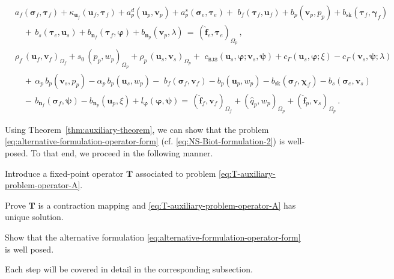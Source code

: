 \documentclass[11pt]{article}
\numberwithin{equation}{section}
\newcommand{\bgamma}{{\boldsymbol\gamma}}
\newcommand{\bsi}{{\boldsymbol\sigma}}
\newcommand{\bvarphi}{{\boldsymbol\varphi}}
\newcommand{\bpsi}{{\boldsymbol\psi}}
\newcommand{\btau}{{\boldsymbol\tau}}
\newcommand{\bchi}{{\boldsymbol\chi}}
\newcommand{\bv}{{\mathbf{v}}}
\newcommand{\f}{\mathbf{f}}
\newcommand{\bu}{\mathbf{u}}
\newcommand{\bn}{{\mathbf{n}}}
\newcommand{\0}{{\mathbf{0}}}
\def\bT{\mathbf{T}}
\def\BJS{\mathtt{BJS}}
\def\sk{\mathrm{sk}}
\def\wh{\widehat}
\numberwithin{equation}{section}
\begin{document}
%
\begin{align}
&  a_f(\bsi_f,\btau_f) + \kappa_{\bu_f}(\bu_f, \btau_f) + a^d_p(\bu_p,\bv_p) + a^s_p(\bsi_e,\btau_e) +\,\, b_f(\btau_f,\bu_f)+ b_p(\bv_p,p_p) + b_\sk(\btau_f,\bgamma_f)  \nonumber \\[0.5ex] 
&\quad +\, b_s(\btau_e,\bu_s) + b_{\bn_f}(\btau_f,\bvarphi) + b_{\bn_p}(\bv_p,\lambda)  \,=\, (\wh{\f}_e,\btau_e)_{\Omega_p} \,,  \nonumber \\[0.5ex]  
& \rho_f\,(\bu_f,\bv_f)_{\Omega_f} + s_0\,(p_p,w_p)_{\Omega_p}
+ \rho_p\,(\bu_s,\bv_s)_{\Omega_p}+\,\, c_{\BJS}(\bu_s,\bvarphi;\bv_s,\bpsi) + c_{\Gamma}(\bu_s,\bvarphi;\xi)- c_{\Gamma}(\bv_s,\bpsi;\lambda)    \nonumber \\[0.5ex]  
&\quad +\, \alpha_p\,b_p(\bv_s,p_p) - \alpha_p\,b_p(\bu_s,w_p) -\,\, b_f(\bsi_f,\bv_f) - b_p(\bu_p,w_p) - b_\sk(\bsi_f,\bchi_f) - b_s(\bsi_e,\bv_s)  \nonumber \\[0.5ex]  
&\quad -\, b_{\bn_f}(\bsi_f,\bpsi) - b_{\bn_p}(\bu_p,\xi)+l_{\bvarphi}(\bvarphi,\bpsi) =\, (\wh{\f}_f,\bv_f)_{\Omega_f} + (\wh{q}_p,w_p)_{\Omega_p} + (\wh{\f}_p,\bv_s)_{\Omega_p} \,.
\label{eq:T-auxiliary-problem-operator-B}
\end{align}

Using Theorem~\ref{thm:auxiliary-theorem}, we can show that the problem \eqref{eq:alternative-formulation-operator-form} (cf. \eqref{eq:NS-Biot-formulation-2}) is well-posed.
To that end, we proceed in the following manner.

\medskip

 Introduce a fixed-point operator $\bT$ associated to problem \eqref{eq:T-auxiliary-problem-operator-A}.

 Prove $\bT$ is a contraction mapping and  \eqref{eq:T-auxiliary-problem-operator-A} has unique solution.

 Show that the alternative formulation \eqref{eq:alternative-formulation-operator-form} is well posed.

\medskip

\noindent Each step will be covered in detail in the corresponding subsection.

\end{document}
